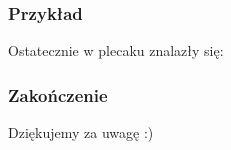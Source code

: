 \documentclass{beamer}
\begin{document}
\begin{frame}
\frametitle{Przykład }
Ostatecznie w plecaku znalazły się:

\begin{figure}
\end{figure}

\end{frame}
\begin{frame}
\centering
\frametitle{Zakończenie}
Dziękujemy za uwagę :)
\end{frame}
\end{document}
